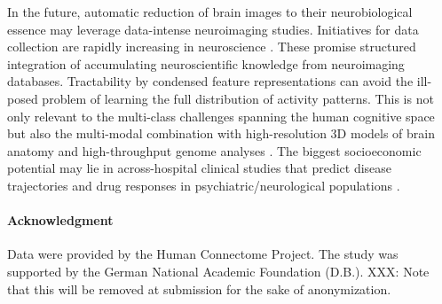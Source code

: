 \documentclass{article} %
\begin{document}
In the future, automatic reduction of brain images to
their neurobiological essence
may leverage data-intense neuroimaging studies.
Initiatives for data collection are rapidly increasing
in neuroscience \cite{poldrack2014data}.
These promise structured integration
of accumulating neuroscientific knowledge from neuroimaging databases.
Tractability by
condensed feature representations can avoid the ill-posed problem of
learning the full distribution of activity patterns.
%
This is not only relevant to the 
multi-class challenges spanning the human cognitive space
\cite{schwartz2013mapping}
but also the
multi-modal combination with
high-resolution 3D models of brain anatomy \cite{amunts2013bigbrain}
and
high-throughput genome analyses \cite{need2010gwas}.
%
The biggest socioeconomic potential may
lie in across-hospital clinical studies that
predict disease trajectories and drug responses
in psychiatric/neurological populations
\cite{frackowiak2015future, gustav2011cost}.

\paragraph{Acknowledgment}
{\small
Data were provided by the Human Connectome Project. The study was supported
by the German National Academic Foundation (D.B.).
XXX: Note that this will be removed at submission for the sake of anonymization.
}

\small


\end{document}
